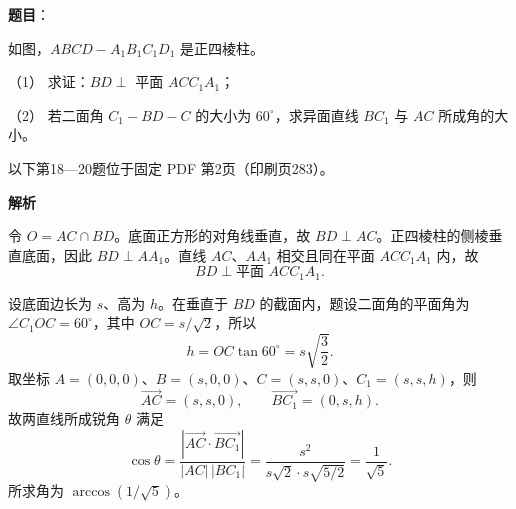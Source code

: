 \begin{answer}

\textbf{题目}：

如图，$ABCD-A_1B_1C_1D_1$ 是正四棱柱。

（1） 求证：$BD\perp$ 平面 $ACC_1A_1$；

（2） 若二面角 $C_1-BD-C$ 的大小为 $60^\circ$，求异面直线 $BC_1$ 与 $AC$ 所成角的大小。
\nopagebreak[4]
\begin{center}\end{center}
\nopagebreak[4]
\begin{gktip}
以下第18—20题位于固定 PDF 第2页（印刷页283）。
\end{gktip}

\textbf{解析}


令 $O=AC\cap BD$。底面正方形的对角线垂直，故 $BD\perp AC$。正四棱柱的侧棱垂直底面，因此 $BD\perp AA_1$。直线 $AC$、$AA_1$ 相交且同在平面 $ACC_1A_1$ 内，故
\nopagebreak[4]
\[
BD\perp\text{平面 }ACC_1A_1.
\]


设底面边长为 $s$、高为 $h$。在垂直于 $BD$ 的截面内，题设二面角的平面角为 $\angle C_1OC=60^\circ$，其中 $OC=s/\sqrt2$，所以
\nopagebreak[4]
\[
h=OC\tan60^\circ=s\sqrt{\frac32}.
\]
取坐标 $A=(0,0,0)$、$B=(s,0,0)$、$C=(s,s,0)$、$C_1=(s,s,h)$，则
\nopagebreak[4]
\[
\overrightarrow{AC}=(s,s,0),\qquad \overrightarrow{BC_1}=(0,s,h).
\]
故两直线所成锐角 $\theta$ 满足
\nopagebreak[4]
\[
\cos\theta
=\frac{|\overrightarrow{AC}\cdot\overrightarrow{BC_1}|}{|AC|\,|BC_1|}
=\frac{s^2}{s\sqrt2\cdot s\sqrt{5/2}}
=\frac1{\sqrt5}.
\]
所求角为 $\arccos(1/\sqrt5)$。



\end{answer}
